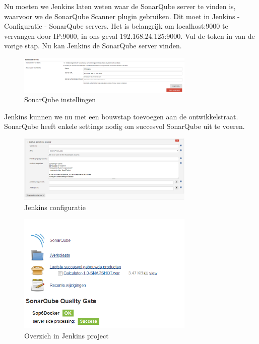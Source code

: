 \documentclass[12pt]{article}
\begin{document}
Nu moeten we Jenkins laten weten waar de SonarQube server te vinden is, waarvoor we de SonarQube Scanner plugin gebruiken. Dit moet in Jenkins - Configuratie - SonarQube servers. Het is belangrijk om localhost:9000 te vervangen door IP:9000, in ons geval 192.168.24.125:9000. Vul de token in van de vorige stap. Nu kan Jenkins de SonarQube server vinden.

\begin{figure}[H]
	\begin{center}
		\includegraphics[width=0.75\textwidth]{images/sonarqube_instellen_jenkins.PNG}
		\caption{SonarQube instellingen\label{fig:sonarqube_instellen_jenkins}}
	\end{center}
\end{figure}

Jenkins kunnen we nu met een bouwstap toevoegen aan de ontwikkelstraat. SonarQube heeft enkele settings nodig om succesvol SonarQube uit te voeren.


\begin{figure}[H]
	\begin{center}
		\includegraphics[width=0.75\textwidth]{images/jenkins_configuratie.png}
		\caption{Jenkins configuratie\label{fig:jenkins_configuratie}}
	\end{center}
\end{figure}



\begin{figure}[H]
	\begin{center}
		\includegraphics[width=0.75\textwidth]{images/overzichtjenkins.PNG}
		\caption{Overzich in Jenkins project\label{fig:overzichtjenkins}}
	\end{center}
\end{figure}
\end{document}
